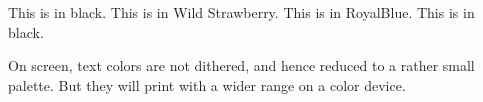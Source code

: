 \documentclass{article}
\begin{document}
\noindent 
This is in black.
{\color[named]{WildStrawberry} This is in Wild Strawberry.}
{\color{RoyalBlue} This is in RoyalBlue.}
This is in black.

On screen, text colors are not dithered, and hence reduced to a
rather small palette.  But they will print with a wider range
on a color device.
\end{document}
